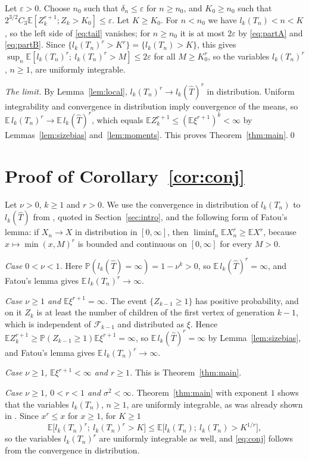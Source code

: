 \documentclass[11pt]{amsart}
\theoremstyle{remark}
\numberwithin{equation}{section}
\newcommand{\Pp}{\mathbb P}
\newcommand{\E}{\mathbb E}
\newcommand{\hT}{\widehat T}
\newcommand{\cF}{\mathcal F}
\begin{document}
Let $\varepsilon>0$. Choose $n_0$ such that $\delta_n\le\varepsilon$ for $n\ge n_0$, and $K_0\ge n_0$ such that $2^{3/2}C_3\E[Z_k^{r+1};Z_k>K_0]\le\varepsilon$. Let $K\ge K_0$. For $n<n_0$ we have $l_k(T_n)<n<K$, so the left side of \eqref{eq:tail} vanishes; for $n\ge n_0$ it is at most $2\varepsilon$ by \eqref{eq:partA} and \eqref{eq:partB}. Since $\{l_k(T_n)^r>K^r\}=\{l_k(T_n)>K\}$, this gives $\sup_n\E[l_k(T_n)^r;\ l_k(T_n)^r>M]\le2\varepsilon$ for all $M\ge K_0^r$, so the variables $l_k(T_n)^r$, $n\ge1$, are uniformly integrable.

\emph{The limit.} By Lemma~\ref{lem:local}, $l_k(T_n)^r\to l_k(\hT)^r$ in distribution. Uniform integrability and convergence in distribution imply convergence of the means, so $\E\, l_k(T_n)^r\to\E\, l_k(\hT)^r$, which equals $\E Z_k^{r+1}\le(\E\xi^{r+1})^k<\infty$ by Lemmas~\ref{lem:sizebias} and~\ref{lem:moments}. This proves Theorem~\ref{thm:main}.\qed

\section{Proof of Corollary~\ref{cor:conj}}\label{sec:cor}

Let $\nu>0$, $k\ge1$ and $r>0$. We use the convergence in distribution of $l_k(T_n)$ to $l_k(\hT)$ from \cite[Section~21.1]{J12}, quoted in Section~\ref{sec:intro}, and the following form of Fatou's lemma: if $X_n\to X$ in distribution in $[0,\infty]$, then $\liminf_n\E X_n^r\ge\E X^r$, because $x\mapsto\min(x,M)^r$ is bounded and continuous on $[0,\infty]$ for every $M>0$.

\emph{Case $0<\nu<1$.} Here $\Pp(l_k(\hT)=\infty)=1-\nu^k>0$, so $\E\, l_k(\hT)^r=\infty$, and Fatou's lemma gives $\E\, l_k(T_n)^r\to\infty$.

\emph{Case $\nu\ge1$ and $\E\xi^{r+1}=\infty$.} The event $\{Z_{k-1}\ge1\}$ has positive probability, and on it $Z_k$ is at least the number of children of the first vertex of generation $k-1$, which is independent of $\cF_{k-1}$ and distributed as $\xi$. Hence $\E Z_k^{r+1}\ge\Pp(Z_{k-1}\ge1)\E\xi^{r+1}=\infty$, so $\E\, l_k(\hT)^r=\infty$ by Lemma~\ref{lem:sizebias}, and Fatou's lemma gives $\E\, l_k(T_n)^r\to\infty$.

\emph{Case $\nu\ge1$, $\E\xi^{r+1}<\infty$ and $r\ge1$.} This is Theorem~\ref{thm:main}.

\emph{Case $\nu\ge1$, $0<r<1$ and $\sigma^2<\infty$.} Theorem~\ref{thm:main} with exponent $1$ shows that the variables $l_k(T_n)$, $n\ge1$, are uniformly integrable, as was already shown in \cite[Section~10]{J06}. Since $x^r\le x$ for $x\ge1$, for $K\ge1$
\[
\E\big[l_k(T_n)^r;\ l_k(T_n)^r>K\big]\le\E\big[l_k(T_n);\ l_k(T_n)>K^{1/r}\big],
\]
so the variables $l_k(T_n)^r$ are uniformly integrable as well, and \eqref{eq:conj} follows from the convergence in distribution.
\end{document}
